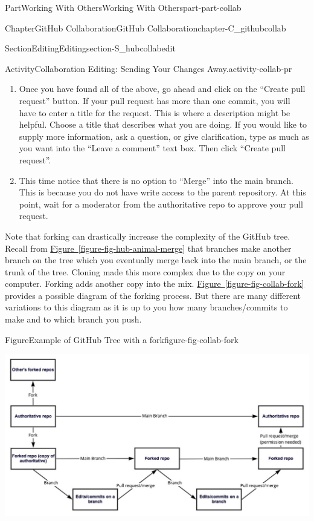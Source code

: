 \documentclass[oneside,10pt,]{book}
\newcommand{\xreffont}{\relax}
\begin{document}
\begin{partptx}{Part}{Working With Others}{}{Working With Others}{}{}{part-part-collab}
\begin{chapterptx}{Chapter}{GitHub Collaboration}{}{GitHub Collaboration}{}{}{chapter-C_githubcollab}
\begin{sectionptx}{Section}{Editing}{}{Editing}{}{}{section-S_hubcollabedit}
\begin{activity}{Activity}{Collaboration Editing: Sending Your Changes Away.}{activity-collab-pr}
\begin{enumerate}[font=\bfseries,label=(\alph*),ref=\alph*]
\begin{enumerate}
\item{}There is a summary of all the commits made on the branch (with their commit messages)%
\item{}There is info on all of your specific changes in each file%
\end{enumerate}
%
\item{}Once you have found all of the above, go ahead and click on the ``Create pull request'' button. If your pull request has more than one commit, you will have to enter a title for the request. This is where a description might be helpful. Choose a title that describes what you are doing. If you would like to supply more information, ask a question, or give clarification, type as much as you want into the ``Leave a comment'' text box. Then click ``Create pull request''.%
\item{}This time notice that there is no option to ``Merge'' into the main branch. This is because you do not have write access to the parent repository. At this point, wait for a moderator from the authoritative repo to approve your pull request.%
\end{enumerate}%
\end{activity}%
Note that forking can drastically increase the complexity of the GitHub tree. Recall from \hyperref[figure-fig-hub-animal-merge]{Figure~{\xreffont\ref{figure-fig-hub-animal-merge}}} that branches make another branch on the tree which you eventually merge back into the main branch, or the trunk of the tree. Cloning made this more complex due to the copy on your computer. Forking adds another copy into the mix. \hyperref[figure-fig-collab-fork]{Figure~{\xreffont\ref{figure-fig-collab-fork}}} provides a possible diagram of the forking process. But there are many different variations to this diagram as it is up to you how many branches\slash{}commits to make and to which branch you push.%
\begin{figureptx}{Figure}{Example of GitHub Tree with a fork}{figure-fig-collab-fork}{}%
\begin{image}{0.025}{0.95}{0.025}{}%
\includegraphics[width=\linewidth]{external/collab_fork.pdf}

\end{image}
\end{figureptx}
\end{sectionptx}
\end{chapterptx}
\end{partptx}
\end{document}
